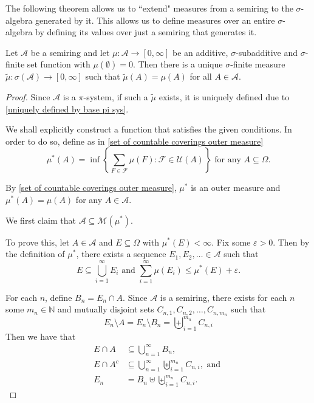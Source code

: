 The following theorem allows us to ``extend" measures from a semiring to the $\sigma$-algebra generated by it. This allows us to define measures over an entire $\sigma$-algebra by defining its values over just a semiring that generates it.

\begin{ftheo}
\label{MeasureExtensionTh}
    Let $\mathcal{A}$ be a semiring and let $\mu:\mathcal{A}\to[0,\infty]$ be an additive, $\sigma$-subadditive and $\sigma$-finite set function with $\mu(\emptyset)=0$. Then there is a unique $\sigma$-finite measure $\tilde\mu:\sigma(\mathcal{A})\to[0,\infty]$ such that $\tilde\mu(A)=\mu(A)$ for all $A\in\mathcal{A}$.
\end{ftheo}
\begin{proof}
    Since $\mathcal{A}$ is a $\pi$-system, if such a $\tilde\mu$ exists, it is uniquely defined due to \cref{uniquely defined by base pi sys}.
    
    We shall explicitly construct a function that satisfies the given conditions. In order to do so, define as in \cref{set of countable coverings outer measure}
    $$\mu^*(A)=\inf\left\{\sum_{F\in\mathcal{F}}\mu(F) : \mathcal{F}\in\mathcal{U}(A) \right\}\text{ for any $A\subseteq\Omega$.}$$
    
    By \cref{set of countable coverings outer measure}, $\mu^*$ is an outer measure and $\mu^*(A)=\mu(A)$ for any $A\in\mathcal{A}$.
    
    \vspace{2mm}
    We first claim that $\mathcal{A}\subseteq\mathcal{M}(\mu^*)$.
    
    To prove this, let $A\in\mathcal{A}$ and $E\subseteq\Omega$ with $\mu^*(E)<\infty$. Fix some $\varepsilon>0$. Then by the definition of $\mu^*$, there exists a sequence $E_1,E_2,\ldots\in\mathcal{A}$ such that
    $$E\subseteq\bigcup_{i=1}^\infty E_i\text{ and }\sum_{i=1}^\infty \mu(E_i)\leq \mu^*(E)+\varepsilon.$$
    
    For each $n$, define $B_n=E_n\cap A$. Since $\mathcal{A}$ is a semiring, there exists for each $n$ some $m_n\in\mathbb{N}$ and mutually disjoint sets $C_{n, 1},C_{n, 2},\ldots,C_{n, m_n}$ such that
    $$E_n\setminus A = E_n\setminus B_n = \biguplus_{i=1}^{m_n}C_{n, i}$$
    Then we have that
    \begin{align*}
        E\cap A &\subseteq \bigcup_{n=1}^\infty B_n, \\
        E\cap A^c &\subseteq \bigcup_{n=1}^\infty\biguplus_{i=1}^{m_n}C_{n,i},\text{ and } \\
        E_n &= B_n\uplus\biguplus_{i=1}^{m_n}C_{n,i}.
    \end{align*}
    

\end{proof}
